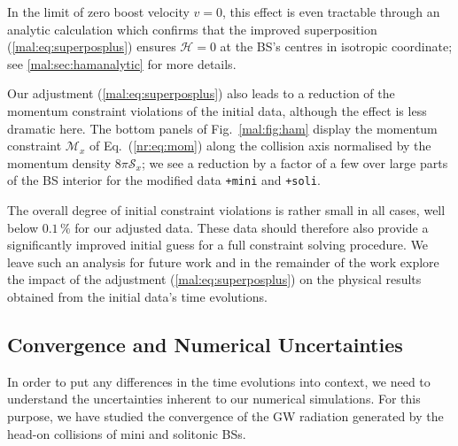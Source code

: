 In the limit of zero boost velocity $v=0$, this effect is even
tractable through an analytic calculation which confirms
that the improved superposition (\ref{mal:eq:superposplus})
ensures $\mathcal{H}=0$ at the BS's centres in isotropic
coordinate; see \ref{mal:sec:hamanalytic} for more details.

Our adjustment (\ref{mal:eq:superposplus}) also leads to
a reduction of the momentum constraint violations of the
initial data, although the effect is less dramatic here.
The bottom panels of Fig.~\ref{mal:fig:ham} display the
momentum constraint $\mathcal{M}_x$ of Eq.~(\ref{nr:eq:mom})
along the collision axis normalised by the momentum
density $8\pi \mathcal{S}_x$; we see a reduction by a factor of a few
over large parts of the BS interior for the modified
data {\tt +mini} and {\tt +soli}.

The overall degree of initial constraint violations is
rather small in all cases, well below $0.1\,\%$ for
our adjusted data. These data should therefore also
provide a significantly improved initial guess for
a full constraint solving procedure. We leave such an
analysis for future work and in the remainder of the
work explore the impact of the adjustment
(\ref{mal:eq:superposplus}) on the physical results
obtained from the initial data's time evolutions.

\subsection{Convergence and Numerical Uncertainties}
%
In order to put any differences in the time evolutions
into context, we need to understand the uncertainties
inherent to our numerical simulations. For this purpose,
we have studied the convergence of the GW radiation
generated by the head-on collisions of mini and solitonic
BSs.

